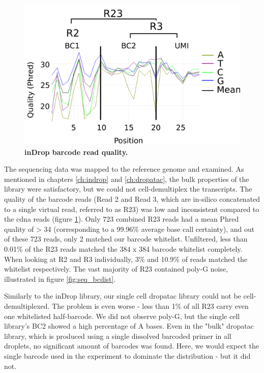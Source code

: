 \clearpage
\begin{figure}
\centering
\includegraphics[width=\textwidth/2]{./ims/seq_ind_qual.png}
\caption[inDrop barcode read quality]{\textbf{inDrop barcode read quality.}}
\label{fig:seq_ind_qual}
\vspace{-20pt}
\end{figure}

The sequencing data was mapped to the reference genome and examined. As mentioned in chapters \ref{ch:indrop} and \ref{ch:dropatac}, the bulk properties of the library were satisfactory, but we could not cell-demultiplex the transcripts. The quality of the barcode reads (Read 2 and Read 3, which are in-silico concatenated to a single virtual read, referred to as R23) was low and inconsistent compared to the \acrshort{cdna} reads (figure \ref{fig:seq_ind_qual}). Only 723 combined R23 reads had a mean Phred quality of > 34 (corresponding to a 99.96\% average base call certainty), and out of these 723 reads, only 2 matched our barcode whitelist. Unfiltered, less than 0.01\% of the R23 reads matched the 384 x 384 barcode whitelist completely. When looking at R2 and R3 individually, 3\% and 10.9\% of reads matched the whitelist respectively. The vast majority of R23 contained poly-G noise, illustrated in figure \ref{fig:seq_bcdist}.\pms

Similarly to the inDrop library, our single cell \acrshort{dropatac} library could not be cell-demultiplexed. The problem is even worse - less than 1\% of all R23 carry even one whitelisted half-barcode. We did not observe poly-G, but the single cell library's BC2 showed a high percentage of A bases. Even in the "bulk" \acrshort{dropatac} library, which is produced using a single dissolved barcoded primer in all droplets, no significant amount of barcodes was found. Here, we would expect the single barcode used in the experiment to dominate the distribution - but it did not.\pms

